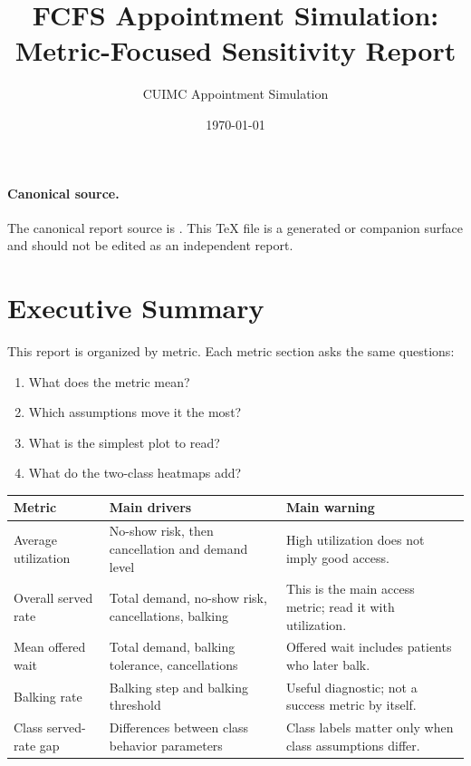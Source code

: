 \documentclass[11pt]{article}
\title{FCFS Appointment Simulation: Metric-Focused Sensitivity Report}
\author{CUIMC Appointment Simulation}
\date{\today}
\begin{document}
\maketitle

\paragraph{Canonical source.} The canonical report source is
. This TeX file is a generated or companion
surface and should not be edited as an independent report.

\tableofcontents
\newpage

\section{Executive Summary}

This report is organized by metric. Each metric section asks the same questions:

\begin{enumerate}
    \item What does the metric mean?
    \item Which assumptions move it the most?
    \item What is the simplest plot to read?
    \item What do the two-class heatmaps add?
\end{enumerate}

\begin{table}[H]
\centering
\renewcommand{\arraystretch}{1.15}
\begin{tabular}{p{}p{}p{}}
\toprule
Metric & Main drivers & Main warning \\
\midrule
Average utilization & No-show risk, then cancellation and demand level & High utilization does not imply good access. \\
Overall served rate & Total demand, no-show risk, cancellations, balking & This is the main access metric; read it with utilization. \\
Mean offered wait & Total demand, balking tolerance, cancellations & Offered wait includes patients who later balk. \\
Balking rate & Balking step and balking threshold & Useful diagnostic; not a success metric by itself. \\
Class served-rate gap & Differences between class behavior parameters & Class labels matter only when class assumptions differ. \\
\bottomrule
\end{tabular}
\end{table}
\end{document}
